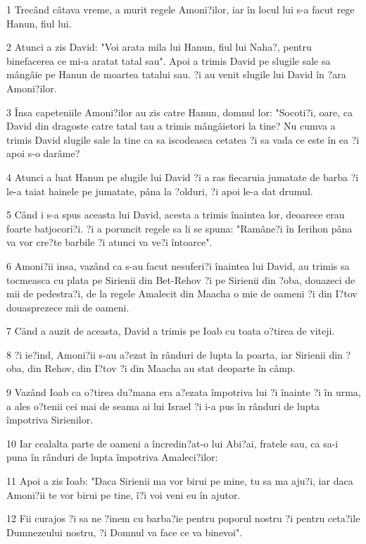 \par 1 Trecând câtava vreme, a murit regele Amoni?ilor, iar în locul lui s-a facut rege Hanun, fiul lui.
\par 2 Atunci a zis David: "Voi arata mila lui Hanun, fiul lui Naha?, pentru binefacerea ce mi-a aratat tatal sau". Apoi a trimis David pe slugile sale sa mângâie pe Hanun de moartea tatalui sau. ?i au venit slugile lui David în ?ara Amoni?ilor.
\par 3 Însa capeteniile Amoni?ilor au zis catre Hanun, domnul lor: "Socoti?i, oare, ca David din dragoste catre tatal tau a trimis mângâietori la tine? Nu cumva a trimis David slugile sale la tine ca sa iscodeasca cetatea ?i sa vada ce este în ea ?i apoi s-o darâme?
\par 4 Atunci a luat Hanun pe slugile lui David ?i a ras fiecaruia jumatate de barba ?i le-a taiat hainele pe jumatate, pâna la ?olduri, ?i apoi le-a dat drumul.
\par 5 Când i s-a spus aceasta lui David, acesta a trimis înaintea lor, deoarece erau foarte batjocori?i. ?i a poruncit regele sa li se spuna: "Ramâne?i în Ierihon pâna va vor cre?te barbile ?i atunci va ve?i întoarce".
\par 6 Amoni?ii insa, vazând ca s-au facut nesuferi?i înaintea lui David, au trimis sa tocmeasca cu plata pe Sirienii din Bet-Rehov ?i pe Sirienii din ?oba, douazeci de mii de pedestra?i, de la regele Amalecit din Maacha o mie de oameni ?i din I?tov douasprezece mii de oameni.
\par 7 Când a auzit de aceasta, David a trimis pe Ioab cu toata o?tirea de viteji.
\par 8 ?i ie?ind, Amoni?ii s-au a?ezat în rânduri de lupta la poarta, iar Sirienii din ?oba, din Rehov, din I?tov ?i din Maacha au stat deoparte în câmp.
\par 9 Vazând Ioab ca o?tirea du?mana era a?ezata împotriva lui ?i înainte ?i în urma, a ales o?tenii cei mai de seama ai lui Israel ?i i-a pus în rânduri de lupta împotriva Sirienilor.
\par 10 Iar cealalta parte de oameni a încredin?at-o lui Abi?ai, fratele sau, ca sa-i puna în rânduri de lupta împotriva Amaleci?ilor:
\par 11 Apoi a zis Ioab: "Daca Sirienii ma vor birui pe mine, tu sa ma aju?i, iar daca Amoni?ii te vor birui pe tine, î?i voi veni eu în ajutor.
\par 12 Fii curajos ?i sa ne ?inem cu barba?ie pentru poporul nostru ?i pentru ceta?ile Dumnezeului nostru, ?i Domnul va face ce va binevoi".

